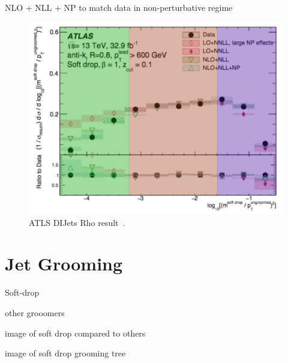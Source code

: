 NLO + NLL + NP to match data in non-perturbative regime

\begin{figure}[htb]
\centering
\includegraphics[width=1.0\textwidth]{visuals/ATLAS-rho-highorder.png}
\caption{ATLS DIJets Rho result~\cite{Dreyer:2018nbf}.}
\label{fig:lund}
\end{figure}




\cite{Salam:2009jx}

\cite{Asquith:2018igt}

\section{Jet Grooming}\label{jetgroom:ch1}

Soft-drop

other grooomers

image of soft drop compared to others

image of soft drop grooming tree





